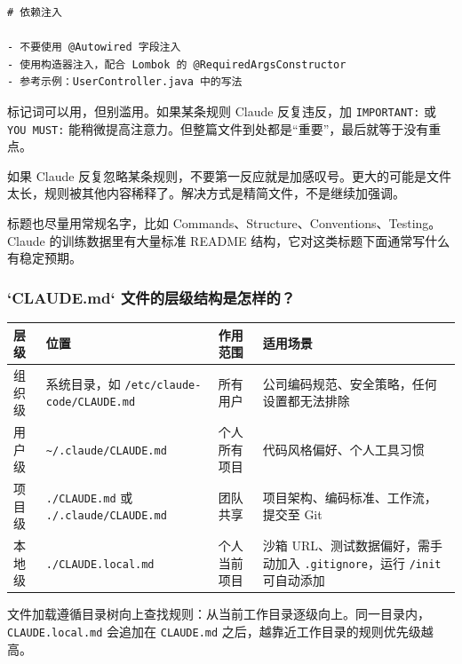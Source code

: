 \documentclass[9pt,a4paper,twocolumn]{ctexart}
\begin{document}
\begin{lstlisting}
# 依赖注入

- 不要使用 @Autowired 字段注入
- 使用构造器注入，配合 Lombok 的 @RequiredArgsConstructor
- 参考示例：UserController.java 中的写法
\end{lstlisting}



标记词可以用，但别滥用。如果某条规则 Claude 反复违反，加 \texttt{IMPORTANT:} 或 \texttt{YOU MUST:} 能稍微提高注意力。但整篇文件到处都是“重要”，最后就等于没有重点。



如果 Claude 反复忽略某条规则，不要第一反应就是加感叹号。更大的可能是文件太长，规则被其他内容稀释了。解决方式是精简文件，不是继续加强调。



标题也尽量用常规名字，比如 Commands、Structure、Conventions、Testing。Claude 的训练数据里有大量标准 README 结构，它对这类标题下面通常写什么有稳定预期。



\subsubsection{`CLAUDE.md` 文件的层级结构是怎样的？}

{\footnotesize
\begin{tabular}{|p{}|p{}|p{}|p{}|}
\hline
\textbf{层级} & \textbf{位置} & \textbf{作用范围} & \textbf{适用场景} \\
\hline
组织级 & 系统目录，如 \texttt{/etc/claude-code/CLAUDE.md} & 所有用户 & 公司编码规范、安全策略，任何设置都无法排除 \\
\hline
用户级 & \texttt{\textasciitilde{}/.claude/CLAUDE.md} & 个人所有项目 & 代码风格偏好、个人工具习惯 \\
\hline
项目级 & \texttt{./CLAUDE.md} 或 \texttt{./.claude/CLAUDE.md} & 团队共享 & 项目架构、编码标准、工作流，提交至 Git \\
\hline
本地级 & \texttt{./CLAUDE.local.md} & 个人当前项目 & 沙箱 URL、测试数据偏好，需手动加入 \texttt{.gitignore}，运行 \texttt{/init} 可自动添加 \\
\hline
\end{tabular}
}



文件加载遵循目录树向上查找规则：从当前工作目录逐级向上。同一目录内，\texttt{CLAUDE.local.md} 会追加在 \texttt{CLAUDE.md} 之后，越靠近工作目录的规则优先级越高。
\end{document}
